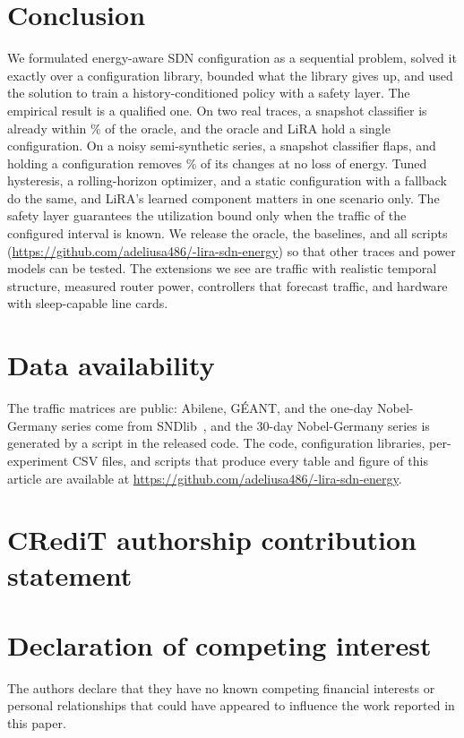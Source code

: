 \documentclass[preprint,12pt]{elsarticle}
\begin{document}
\section{Conclusion}\label{sec:conclusion}

We formulated energy-aware SDN configuration as a sequential problem, solved it exactly over a configuration library, bounded what the library gives up, and used the solution to train a history-conditioned policy with a safety layer. The empirical result is a qualified one. On two real traces, a snapshot classifier is already within \bfourAbiGap\% of the oracle, and the oracle and LiRA hold a single configuration. On a noisy semi-synthetic series, a snapshot classifier flaps, and holding a configuration removes \nobY\% of its changes at no loss of energy. Tuned hysteresis, a rolling-horizon optimizer, and a static configuration with a fallback do the same, and LiRA's learned component matters in one scenario only. The safety layer guarantees the utilization bound only when the traffic of the configured interval is known. We release the oracle, the baselines, and all scripts (\url{https://github.com/adeliusa486/-lira-sdn-energy}) so that other traces and power models can be tested. The extensions we see are traffic with realistic temporal structure, measured router power, controllers that forecast traffic, and hardware with sleep-capable line cards.

\section*{Data availability}
The traffic matrices are public: Abilene, G\'{E}ANT, and the one-day Nobel-Germany series come from SNDlib~\cite{orlowski2010sndlib,uhlig2006geant,zhang2003tomogravity}, and the 30-day Nobel-Germany series is generated by a script in the released code. The code, configuration libraries, per-experiment CSV files, and scripts that produce every table and figure of this article are available at \url{https://github.com/adeliusa486/-lira-sdn-energy}.

\section*{CRediT authorship contribution statement}

\section*{Declaration of competing interest}
The authors declare that they have no known competing financial interests or personal relationships that could have appeared to influence the work reported in this paper.
\end{document}
